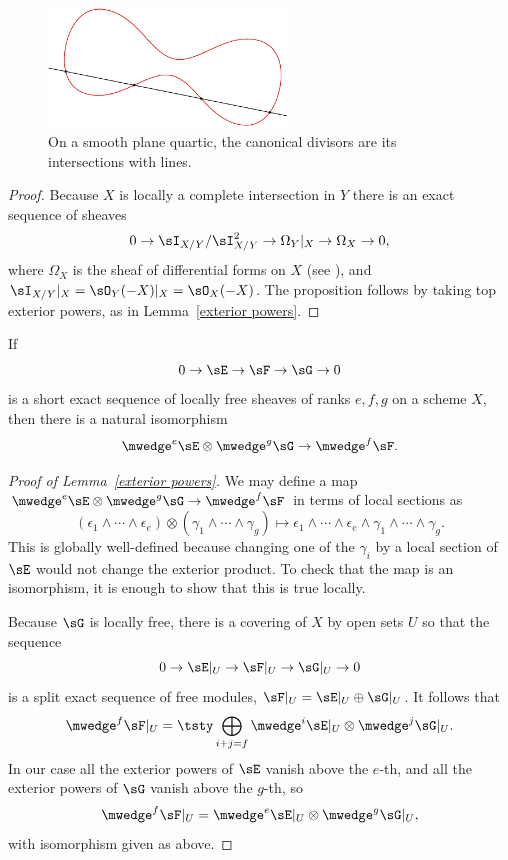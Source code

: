 \begin{figure}
\centerline{\includegraphics[width=2.5in]{"main/Fig02-1"}}
\caption{On a smooth plane quartic, the canonical divisors are its
  intersections with lines.
}\label{canonical of quartic}
\end{figure}


\begin{proof}
 Because $X$ is locally a complete intersection in $Y$ there is an exact sequence of sheaves
 $$
0\to  \sI_{X/Y}/\sI_{X/Y}^{2} \to \Omega_{Y}| _{X} \to \Omega_{X} \to 0
,
 $$
 where $\Omega_{X}$ is the sheaf of differential forms on $X$ (see \cite[Proposition 16.3]{Eisenbud95}), and
$ \sI_{X/Y}|_{X} = \sO_{Y}(-X)|_{X} = \sO_{X}(-X)$. The proposition
follows by taking top exterior powers,
%
as in Lemma~\ref{exterior powers}.\end{proof}

\begin{lemma}\label{exterior powers}
 If 
$$
0\to \sE \to \sF\to \sG \to 0
$$
is a short exact sequence of locally free sheaves of ranks $e,f,g$ 
 on a scheme $X$, then there is a natural
isomorphism 
$$
\mwedge^e\sE \otimes \mwedge^g \sG \to \mwedge^f\sF.
$$
\end{lemma}

\begin{proof}[Proof of Lemma~\ref{exterior powers}]
 We may define a map
$
\mwedge^e\sE \otimes \mwedge^g \sG \to \mwedge^f\sF
$
in terms of local sections as
$$
(\epsilon_1\wedge\cdots \wedge \epsilon_e) \otimes (\gamma_1\wedge\cdots\wedge \gamma_g)
\mapsto \epsilon_1\wedge\cdots \wedge \epsilon_e\wedge\gamma_1\wedge\cdots\wedge \gamma_g.
$$
This is globally well-defined because changing one of the $\gamma_i$ by a local section of $\sE$ would not
change the exterior product.
To check that the map is an isomorphism, it is enough to show that this is true locally.

Because $\sG$ is locally free, there is a covering of $X$ by open sets $U$
so that the sequence
$$
0\to \sE|_U \to \sF|_U\to \sG|_U \to 0
$$
is a split exact sequence of free modules, $\sF|_U = \sE|_U\oplus \sG|_U$.
It follows that
$$
\mwedge^f\sF|_U = 
\tsty\bigoplus\limits_{i+j = f} \mwedge^i \sE|_U \otimes \mwedge^j\sG|_U.
$$
In our case all the exterior powers of $\sE$ vanish above the $e$-th, and all the 
exterior powers of $\sG$ vanish above the $g$-th, so 
$$
\mwedge^f\sF|_U =  \mwedge^e \sE|_U \otimes \mwedge^g\sG|_U,
$$
with isomorphism given as above.
\end{proof}


